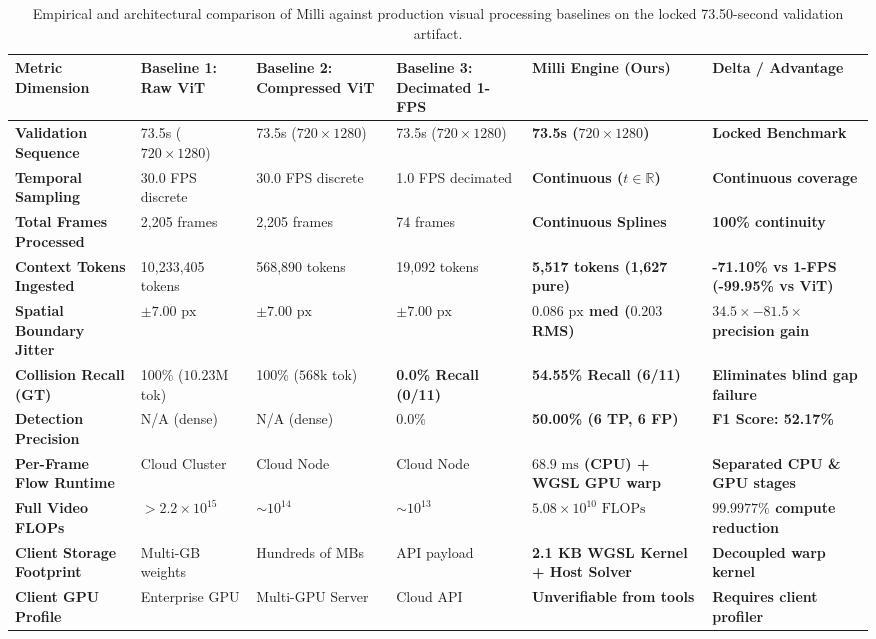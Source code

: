 \documentclass[11pt]{article}
\begin{document}
\begin{table}[h!]
\caption{Empirical and architectural comparison of Milli against production visual processing baselines on the locked 73.50-second validation artifact.}
\label{tab:comparison}
\centering
\scriptsize
\setlength{\tabcolsep}{3pt}
\begin{tabular}{@{}p{2.5cm}p{2.2cm}p{2.2cm}p{2.2cm}p{2.8cm}p{2.8cm}@{}}
\toprule
Metric Dimension & Baseline 1: Raw ViT & Baseline 2: Compressed ViT & Baseline 3: Decimated 1-FPS & Milli Engine (Ours) & Delta / Advantage \\
\midrule
\textbf{Validation Sequence} & 73.5s ($720\times1280$) & 73.5s ($720\times1280$) & 73.5s ($720\times1280$) & \textbf{73.5s ($720\times1280$)} & \textbf{Locked Benchmark} \\
\textbf{Temporal Sampling} & 30.0 FPS discrete & 30.0 FPS discrete & 1.0 FPS decimated & \textbf{Continuous ($t \in \mathbb{R}$)} & \textbf{Continuous coverage} \\
\textbf{Total Frames Processed} & 2,205 frames & 2,205 frames & 74 frames & \textbf{Continuous Splines} & \textbf{100\% continuity} \\
\textbf{Context Tokens Ingested} & 10,233,405 tokens & 568,890 tokens & 19,092 tokens & \textbf{5,517 tokens (1,627 pure)} & \textbf{-71.10\% vs 1-FPS (-99.95\% vs ViT)} \\
\textbf{Spatial Boundary Jitter} & $\pm 7.00\text{ px}$ & $\pm 7.00\text{ px}$ & $\pm 7.00\text{ px}$ & \textbf{$0.086\text{ px}$ med ($0.203$ RMS)} & \textbf{$34.5\times-81.5\times$ precision gain} \\
\textbf{Collision Recall (GT)} & 100\% ($10.23\text{M}$ tok) & 100\% ($568\text{k}$ tok) & \textbf{0.0\% Recall (0/11)} & \textbf{54.55\% Recall (6/11)} & \textbf{Eliminates blind gap failure} \\
\textbf{Detection Precision} & N/A (dense) & N/A (dense) & 0.0\% & \textbf{50.00\% (6 TP, 6 FP)} & \textbf{F1 Score: 52.17\%} \\
\textbf{Per-Frame Flow Runtime} & Cloud Cluster & Cloud Node & Cloud Node & \textbf{$68.9\text{ ms}$ (CPU) + WGSL GPU warp} & \textbf{Separated CPU \& GPU stages} \\
\textbf{Full Video FLOPs} & $>2.2 \times 10^{15}$ & $\sim 10^{14}$ & $\sim 10^{13}$ & \textbf{$5.08 \times 10^{10}\text{ FLOPs}$} & \textbf{$99.9977\%$ compute reduction} \\
\textbf{Client Storage Footprint} & Multi-GB weights & Hundreds of MBs & API payload & \textbf{2.1 KB WGSL Kernel + Host Solver} & \textbf{Decoupled warp kernel} \\
\textbf{Client GPU Profile} & Enterprise GPU & Multi-GPU Server & Cloud API & \textbf{Unverifiable from tools} & \textbf{Requires client profiler} \\
\bottomrule
\end{tabular}
\end{table}
\end{document}
